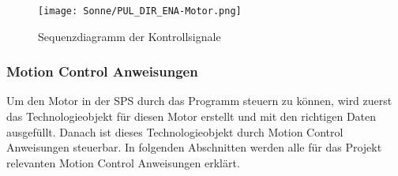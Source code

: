     \begin{figure}[h]
        \centering
        \texttt{[image: Sonne/PUL\_DIR\_ENA-Motor.png]}
        \caption{Sequenzdiagramm der Kontrollsignale \cite{User-Manual_CL57T}}
        \label{Sequenzdiagramm}
    \end{figure}


\subsubsection{Motion Control Anweisungen}
Um den Motor in der SPS durch das Programm steuern zu können, wird zuerst das Technologieobjekt für diesen Motor erstellt und mit den richtigen Daten ausgefüllt. Danach ist dieses Technologieobjekt durch Motion Control Anweisungen steuerbar. In folgenden Abschnitten werden alle für das Projekt relevanten Motion Control Anweisungen erklärt. 

